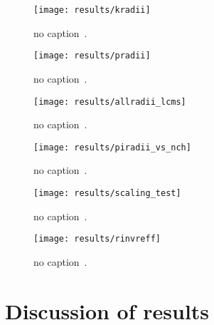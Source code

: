       \begin{figure}[h]
        \centering
        \centerline{\texttt{[image: results/kradii]}}
        \caption{no caption~\cite{galazyn}.}
      \label{fig:kradii}
      \end{figure}



      \begin{figure}[h]
        \centering
        \centerline{\texttt{[image: results/pradii]}}
        \caption{no caption~\cite{galazyn}.}
      \label{fig:pradii}
      \end{figure}    

      \begin{figure}[h]
        \centering
        \centerline{\texttt{[image: results/allradii\_lcms]}}
        \caption{no caption~\cite{galazyn}.}
      \label{fig:allradii}
      \end{figure}    

      \begin{figure}[h]
        \centering
        \centerline{\texttt{[image: results/piradii\_vs\_nch]}}
        \caption{no caption~\cite{galazyn}.}
      \label{fig:piradii}
      \end{figure}    

      \begin{figure}[h]
        \centering
        \centerline{\texttt{[image: results/scaling\_test]}}
        \caption{no caption~\cite{galazyn}.}
      \label{fig:piradii}
      \end{figure}    

      \begin{figure}[h]
        \centering
        \centerline{\texttt{[image: results/rinvreff]}}
        \caption{no caption~\cite{galazyn}.}
      \label{fig:piradii}
      \end{figure}

    \FloatBarrier
  \section{Discussion of results}

